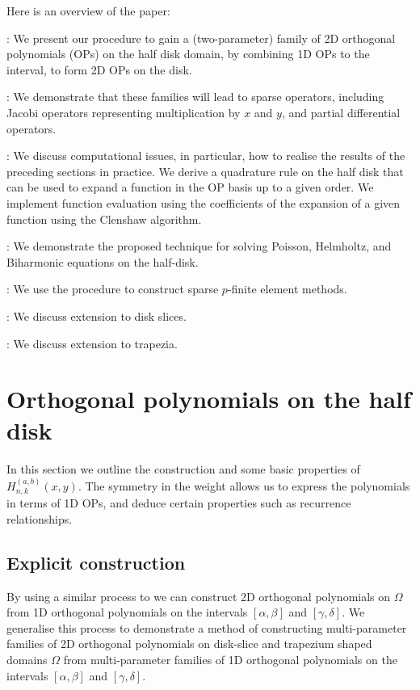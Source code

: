 \documentclass[11pt, oneside]{article}   	%
\newcommand{\hdop}{H}
\newcommand{\hdopnkab}{\hdop_{n,k}^{(a,b)}}
\begin{document}
Here is an overview of the paper:  

\noindent {}: We present our procedure  to gain a (two-parameter) family of 2D orthogonal polynomials (OPs) on the half disk domain, by combining 1D OPs to the interval, to form 2D OPs on the disk. 

\noindent{}: We demonstrate that these families will lead to sparse operators, including Jacobi operators representing multiplication by $x$ and $y$, and partial differential operators.

\noindent{}: We discuss computational issues, in particular, how to realise the results of the preceding sections in practice.  We  derive a quadrature rule on the half disk that can be used to expand a function in the OP basis up to a given order.  We implement function evaluation using the coefficients of the expansion of a given function using the Clenshaw algorithm.

\noindent{}: We demonstrate the proposed technique for solving Poisson, Helmholtz, and Biharmonic equations on the half-disk.  

\noindent{}: We use the procedure to construct sparse $p$-finite element methods.

\noindent{}: We discuss extension to disk slices.

\noindent{}: We discuss extension to trapezia.


\section{Orthogonal polynomials on the half disk}\label{Section:OPs}

In this section we outline the construction and some basic properties of $\hdopnkab(x,y)$. The symmetry in the weight allows us to express the polynomials in terms of 1D OPs, and deduce certain properties such as recurrence relationships. 

\subsection{Explicit construction}

By using a similar process to \cite[p55--56]{dunkl2014orthogonal} we can construct 2D orthogonal polynomials on $\Omega$ from 1D orthogonal polynomials on the intervals \([\alpha,\beta]\) and \([\gamma,\delta]\). We generalise this process to demonstrate a method of constructing multi-parameter families of 2D orthogonal polynomials on disk-slice and trapezium shaped domains $\Omega$ from multi-parameter families of 1D orthogonal polynomials on the intervals \([\alpha,\beta]\) and \([\gamma,\delta]\).
\end{document}
